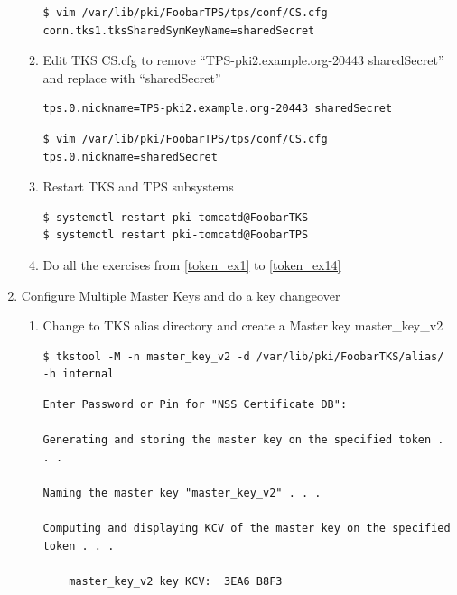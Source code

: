 \documentclass[a4paper]{article}
\begin{document}
\begin{enumerate}[label*=\arabic*.]
\begin{enumerate}[label*=\arabic*.]
            \begin{lstlisting}[style=bashInputStyle]
$ vim /var/lib/pki/FoobarTPS/tps/conf/CS.cfg
conn.tks1.tksSharedSymKeyName=sharedSecret
            \end{lstlisting}
        \item Edit TKS CS.cfg to remove ``TPS-pki2.example.org-20443 sharedSecret'' and replace with ``sharedSecret''
            \begin{lstlisting}
tps.0.nickname=TPS-pki2.example.org-20443 sharedSecret            
            \end{lstlisting}
            \begin{lstlisting}[style=bashInputStyle]
$ vim /var/lib/pki/FoobarTPS/tps/conf/CS.cfg
tps.0.nickname=sharedSecret
            \end{lstlisting}
        \item Restart TKS and TPS subsystems
            \begin{lstlisting}[style=bashInputStyle]
$ systemctl restart pki-tomcatd@FoobarTKS
$ systemctl restart pki-tomcatd@FoobarTPS
            \end{lstlisting}
        \item Do all the exercises from \ref{token_ex1} to \ref{token_ex14}
        \end{enumerate}            
        \item Configure Multiple Master Keys and do a key changeover
             \begin{enumerate}[label*=\arabic*.]
                \item Change to TKS alias directory and create a Master key master\_key\_v2
                    \begin{lstlisting}[style=bashInputStyle]
$ tkstool -M -n master_key_v2 -d /var/lib/pki/FoobarTKS/alias/ -h internal                    
                    \end{lstlisting}
                    \begin{lstlisting}
Enter Password or Pin for "NSS Certificate DB":

Generating and storing the master key on the specified token . . .

Naming the master key "master_key_v2" . . .

Computing and displaying KCV of the master key on the specified token . . .

    master_key_v2 key KCV:  3EA6 B8F3



\end{lstlisting}
\end{enumerate}
\end{enumerate}
\end{document}
